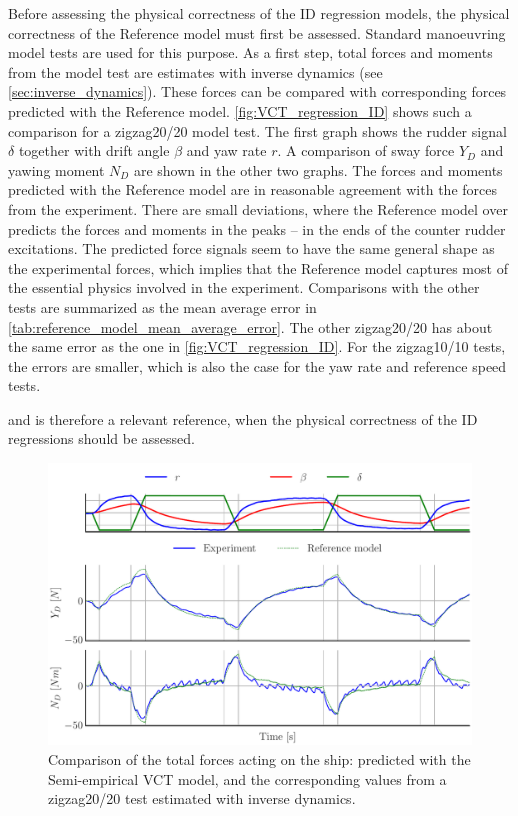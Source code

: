 Before assessing the physical correctness of the ID regression models, the physical correctness of the Reference model must first be assessed. Standard manoeuvring model tests are used for this purpose. As a first step, total forces and moments from the model test are estimates with inverse dynamics (see \autoref{sec:inverse_dynamics}). These forces can be compared with corresponding forces predicted with the Reference model. 
\autoref{fig:VCT_regression_ID} shows such a comparison for a zigzag20/20 model test. The first graph shows the rudder signal $\delta$ together with drift angle $\beta$ and yaw rate $r$. A comparison of sway force $Y_D$ and yawing moment $N_D$ are shown in the other two graphs. The forces and moments predicted with the Reference model are in reasonable agreement with the forces from the experiment. There are small deviations, where the Reference model over predicts the forces and moments in the peaks -- in the ends of the counter rudder excitations. 
The predicted force signals seem to have the same general shape as the experimental forces, which implies that the Reference model captures most of the essential physics involved in the experiment.
Comparisons with the other tests are summarized as the mean average error in \autoref{tab:reference_model_mean_average_error}. The other zigzag20/20 has about the same error as the one in \autoref{fig:VCT_regression_ID}. For the zigzag10/10 tests, the errors are smaller, which is also the case for the yaw rate and reference speed tests.

and is therefore a relevant reference, when the physical correctness of the ID regressions should be assessed. 
\begin{figure}[h!]
    \includegraphics[width=\columnwidth]{figures/result_VCT_regression.VCT_regression_ID.pdf}
    \caption{Comparison of the total forces acting on the ship: predicted with the Semi-empirical VCT model, and the corresponding values from a zigzag20/20 test estimated with inverse dynamics.}
    \label{fig:VCT_regression_ID}
\end{figure}

